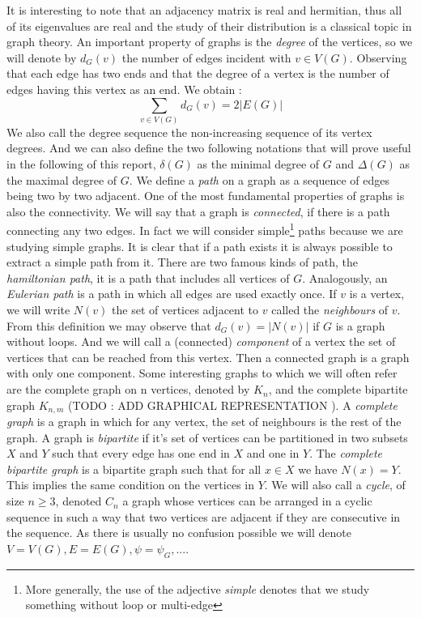 It is interesting to note that an adjacency matrix is real and hermitian, thus all of its eigenvalues are real and the study of their distribution is a classical topic in graph theory.
\newline
An important property of graphs is the \emph{degree} of the vertices, so we will denote by $d_G(v)$ the number of edges incident with $v \in V(G)$.
Observing that each edge has two ends and that the degree of a vertex is the number of edges having this vertex as an end. We obtain :
\begin{equation}
	\sum_{v\in V(G)} d_G(v) = 2 |E(G)|
\end{equation}
We also call the degree sequence the non-increasing sequence of its vertex degrees.
And we can also define the two following notations that will prove useful in the following of this report, $\delta(G)$ as the minimal degree of $G$ and $\Delta(G)$ as the maximal degree of $G$.
\newline
We define a \emph{path} on a graph as a sequence of edges being two by two adjacent. 
One of the most fundamental properties of graphs is also the connectivity.
We will say that a graph is \emph{connected}, if there is a path connecting any two edges. 
In fact we will consider simple\footnote{ More generally, the use of the adjective \emph{simple} denotes that we study something without loop or multi-edge}  paths because we are studying simple graphs.
It is clear that if a path exists it is always possible to extract a simple path from it.
There are two famous kinds of path, the \emph{hamiltonian path}, it is a path that includes all vertices of $G$. Analogously, an \emph{Eulerian path} is a path in which all edges are used exactly once.
\newline
If $v$ is a vertex, we will write $N(v)$ the set of vertices adjacent to $v$ called the \emph{neighbours} of $v$.
From this definition we may observe that $d_G(v) = |N(v)|$ if $G$ is a graph without loops. 
And we will call a (connected) \emph{component} of a vertex the set of vertices that can be reached from this vertex. 
Then a connected graph is a graph with only one component.
\newline
Some interesting graphs to which we will often refer are the complete graph on n vertices, denoted by $K_n$, and the complete bipartite graph $K_{n,m}$ (TODO : ADD GRAPHICAL REPRESENTATION ). 
A \emph{complete graph} is a graph in which for any vertex, the set of neighbours is the rest of the graph. 
A graph is \emph{bipartite} if it's set of vertices can be partitioned in two subsets $X$ and $Y$ such that every edge has one end in $X$ and one in $Y$. 
The \emph{complete bipartite graph} is a bipartite graph such that for all $x \in X$ we have $N(x) = Y$. 
This implies the same condition on the vertices in $Y$.
We will also call a \emph{cycle}, of size $n \geq 3$, denoted $C_n$ a graph whose vertices can be arranged in a cyclic sequence in such a way that two vertices are adjacent if they are consecutive in the sequence.
\newline
As there is usually no confusion possible we will denote $V = V(G), E =E(G), \psi = \psi_G, ...$. 


